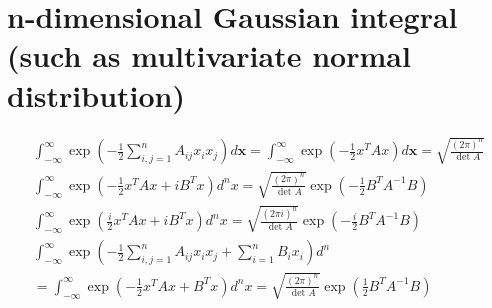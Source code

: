 \section*{n-dimensional Gaussian integral (such as multivariate normal distribution)}
\begin{center}
    \begin{equation*}
        \begin{gathered}
        \int_{-\infty}^{\infty} \exp \left(-\frac{1}{2} \sum_{i, j=1}^{n} A_{i j} x_{i} x_{j}\right) d \mathbf{x}=\int_{-\infty}^{\infty} \exp \left(-\frac{1}{2} x^{T} A x\right) d \mathbf{x}=\sqrt{\frac{(2 \pi)^{n}}{\operatorname{det} A}} \\
        \int_{-\infty}^{\infty} \exp \left(-\frac{1}{2} x^{T} A x+i B^{T} x\right) d^{n} x=\sqrt{\frac{(2 \pi)^{n}}{\operatorname{det} A}} \exp \left(-\frac{1}{2} B^{T} A^{-1} B\right) \\
        \int_{-\infty}^{\infty} \exp \left(\frac{i}{2} x^{T} A x+i B^{T} x\right) d^{n} x=\sqrt{\frac{(2 \pi i)^{n}}{\operatorname{det} A}} \exp \left(-\frac{i}{2} B^{T} A^{-1} B\right) \\
        \int_{-\infty}^{\infty} \exp \left(-\frac{1}{2} \sum_{i, j=1}^{n} A_{i j} x_{i} x_{j}+\sum_{i=1}^{n} B_{i} x_{i}\right) d^{n}\\
        =\int_{-\infty}^{\infty} \exp \left(-\frac{1}{2} x^{T} A x+B^{T} x\right) d^{n} x=\sqrt{\frac{(2 \pi)^{n}}{\operatorname{det} A}} \exp \left(\frac{1}{2} B^{T} A^{-1} B\right) \\
        \end{gathered}
    \end{equation*}
\end{center}

